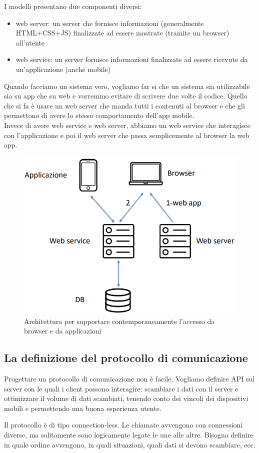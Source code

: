 I modelli presentano due componenti diversi:
\begin{itemize}
    \item web server: un server che fornisce informazioni (generalmente HTML+CSS+JS) finalizzate ad essere mostrate (tramite un browser) all'utente 
    \item web service: un server fornisce informazioni finalizzate ad essere ricevute da un’applicazione (anche mobile)
\end{itemize}

Quando facciamo un sistema vero, vogliamo far si che un sistema sia utilizzabile sia su app che su web e vorremmo evitare di scrivere due volte il codice.
Quello che si fa è usare un web server che manda tutti i contenuti al browser e che gli permettono di avere lo stesso comportamento dell'app mobile. 
\\ Invece di avere web service e web server, abbiamo un web service che interagisce con l'applicazione e poi il web server che passa semplicemente al browser la web app. 

\begin{figure}[!ht]
    \centering
    \includegraphics[width=.5\textwidth]{images/Mobile computing/3. Reti e architetture/app_web.PNG}
    \caption{Architettura per supportare contemporaneamente l'accesso da browser e da applicazioni}
    \label{fig:sistemi web_app}
\end{figure}

\subsection{La definizione del protocollo di comunicazione}
Progettare un protocollo di comunicazione non è facile. Vogliamo definire API sul server con le quali i client possono interagire: scambiare i dati con il server e ottimizzare il volume di dati scambiati, tenendo conto dei vincoli dei dispositivi mobili e permettendo una buona esperienza utente. 

Il protocollo è di tipo connection-less. Le chiamate avvengono con connessioni diverse, ma solitamente sono logicamente legate le une alle altre. Bisogna definire in quale ordine avvengono, in quali situazioni, quali dati si devono scambiare, ecc.

